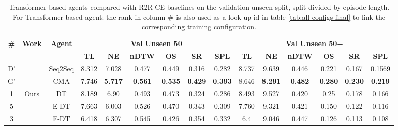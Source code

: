 \begin{table}
\centering
\caption{\label{tab:best_unseen_50}Transformer based agents compared with R2R-CE baselines on the validation unseen split, split divided by episode length. For Transformer based agent: the rank in column \# is also used as a look up id in table \ref{tab:all-configs-final} to link the corresponding training configuration.}
\begin{tabular}{@{\hskip3pt}c@{\hskip3pt}c@{\hskip3pt}c@{\hskip3pt}c@{\hskip3pt}c@{\hskip3pt}c@{\hskip3pt}c@{\hskip3pt}c@{\hskip3pt}c@{\hskip3pt}c@{\hskip3pt}c@{\hskip3pt}c@{\hskip3pt}c@{\hskip3pt}c@{\hskip3pt}c}
\toprule
\textbf{\#} & \textbf{Work} & \textbf{Agent} & \multicolumn{6}{c}{\textbf{Val Unseen 50}} & \multicolumn{6}{c}{\textbf{Val Unseen 50+}} \\
 \textbf{~} &     \textbf{~} &                \textbf{~} &       \textbf{TL} &    \textbf{NE} &   \textbf{nDTW} &     \textbf{OS} &    \textbf{SR} &    \textbf{SPL} &         \textbf{TL} &     \textbf{NE} &   \textbf{nDTW} &     \textbf{OS} &    \textbf{SR} &    \textbf{SPL} \\
\midrule
          D' &             \citet{VLNCE} &                  Seq2Seq &             8.312 &          7.028 &           0.477 &  0.449 &  0.316 &           0.282 &                8.737 &           9.639 &           0.446 &  0.221 &  0.167 &  0.1569 \\
          G' &           &  CMA &             7.746 &          \textbf{5.717} &           \textbf{0.561} &           \textbf{0.535} &          \textbf{0.429} &           \textbf{0.393} &               8.646 &           \textbf{8.291} &           \textbf{0.482} &           \textbf{0.280} &          \textbf{0.230} &           \textbf{0.219} \\
\midrule
          1 &             Ours &                  DT &             8.189 &          6.90 &           0.493 &  0.473 &  0.324 &           0.286 &                8.493 &           9.527 &          0.420 &  0.25 &  0.178 &  0.166 \\
          5 &            &  E-DT &             7.663 &          6.003 &           0.526 &           0.470 &          0.343 &           0.309 &               7.760 &           9.321 &           0.421 &           0.150 &          0.122 &           0.116 \\
          3 &            &  F-DT &              6.418 &  6.307 &  0.545 &           0.426 &          0.354 &  0.332 &                 6.4 &  9.046 &  0.447 &           0.126 &          0.113 &           0.108 \\
\bottomrule
\end{tabular}
\end{table}

